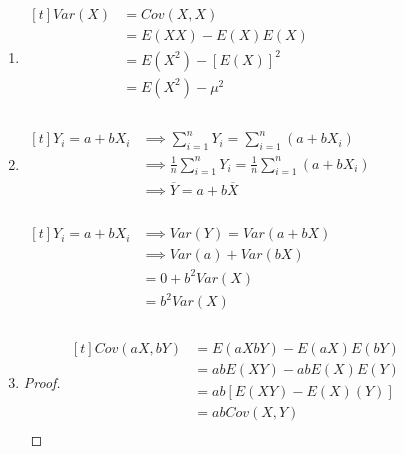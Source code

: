 \documentclass{article}
\begin{document}
\begin{enumerate}
    \item
    $\begin{aligned}[t]
    Var(X)&=Cov(X,X)\\
    &=E(XX)-E(X)E(X)\\
    &=E(X^2)-[E(X)]^2\\
    &=E(X^2)-\mu^2\\
    \ \\
    \end{aligned}$
    
    \item
    $\begin{aligned}[t]
    Y_i=a+bX_i&\implies\displaystyle{\sum_{i=1}^{n}Y_i=\sum_{i=1}^{n}(a+bX_i)}\\
    &\implies\frac{1}{n}\sum_{i=1}^{n}Y_i=\frac{1}{n}\sum_{i=1}^{n}(a+bX_i)\\
    &\implies\overline{Y}=a+b\overline{X}
    \ \\
    \end{aligned}$
    \ \\
    \ \\
    $\begin{aligned}[t]
    Y_i=a+bX_i&\implies Var(Y)=Var(a+bX)\\
    &\implies Var(a)+Var(bX)\\
    &=0+b^2Var(X)\\
    &=b^2Var(X)\\
    \ \\
    \end{aligned}$
    
    \item
    \begin{proof}
        $\begin{aligned}[t]
            Cov(aX,bY)&=E(aXbY)-E(aX)E(bY)\\
            &=abE(XY)-abE(X)E(Y)\\
            &=ab[E(XY)-E(X)(Y)]\\
            &=abCov(X,Y)\\
        \end{aligned}$
    \ \\
    \end{proof}
    

\end{enumerate}
\end{document}

